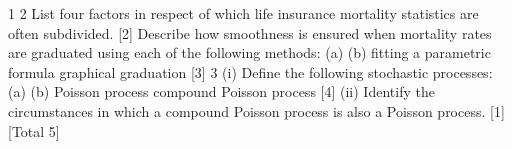 1
2
List four factors in respect of which life insurance mortality statistics are often
subdivided.
[2]
Describe how smoothness is ensured when mortality rates are graduated using each of
the following methods:
(a)
(b)
fitting a parametric formula
graphical graduation
[3]
3
(i)
Define the following stochastic processes:
(a)
(b)
Poisson process
compound Poisson process
[4]
(ii)
Identify the circumstances in which a compound Poisson process is also a
Poisson process.
[1]
[Total 5]

